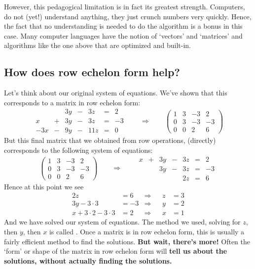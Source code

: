 \documentclass{ximera}
\begin{document}
However, this pedagogical limitation is in fact its greatest
strength. Computers, do not (yet!) understand anything, they just
crunch numbers very quickly. Hence, the fact that no understanding is
needed to do the algorithm is a bonus in this case. Many computer
languages have the notion of `vectors' and `matrices' and algorithms
like the one above that are optimized and built-in.




\subsection{How does row echelon form help?}

Let's think about our original system of equations. We've shown that
this corresponds to a matrix in row echelon form:
\[
  \begin{array}{ccccccc}
    & & 3y &-& 3z &=& 2 \\
    x& +&3y&-&3z&=&-3\\
    -3x& -&9y&-&11z&=&0
  \end{array}
  \qquad\Longrightarrow\qquad
  \left(
    \begin{array}{ccc|c}
      1 &   3 & -3 & 2  \\
      0 &   3 & -3 & -3 \\
      0& 0  & 2 & 6
    \end{array}
  \right)
\]
But this final matrix that we obtained from row operations, (directly)
corresponds to the following system of equations:
\[
  \left(
    \begin{array}{ccc|c}
      1 &   3 & -3 & 2  \\
      0 &   3 & -3 & -3 \\
      0& 0  & 2 & 6
    \end{array}
  \right)
  \qquad\Longrightarrow\qquad
  \begin{array}{ccccccc}
    x  &+ & 3y &-& 3z &=& 2 \\
       &  &3y&-&3z&=&-3\\
       & & & &2z&=&6
  \end{array}
\]
Hence at this point we see
\begin{align*}
  2z &= 6 &\Rightarrow  & & z &= 3\\
  3y-3\cdot 3 &= -3 &\Rightarrow  & & y &= 2\\
  x + 3\cdot 2 - 3\cdot 3 &= 2  &\Rightarrow & & x &= 1
\end{align*}
And we have solved our system of equations. The method we used,
solving for $z$, then $y$, then $x$ is called . Once a matrix is in row echelon form, this is usually
a fairly efficient method to find the solutions.  \textbf{But wait,
  there's more!}  Often the `form' or shape of the matrix in row
echelon form will \textbf{tell us about the solutions, without
  actually finding the solutions.}
\end{document}
